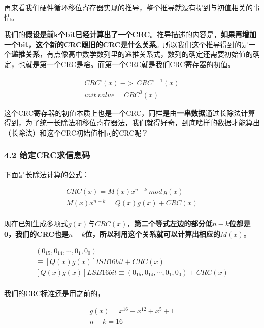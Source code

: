 \documentclass[
]{article}
\begin{document}
再来看我们硬件循环移位寄存器实现的推导，整个推导就没有提到与初值相关的事情。

我们的\textbf{假设是前k个bit已经计算出了一个CRC}。推导描述的内容是，\textbf{如果再增加一个bit，这个新的CRC跟旧的CRC是什么关系}。所以我们这个推导得到的是一个\textbf{递推关系}，有点像高中数学数列里的递推关系式，数列的确定还需要初始值的确定，也就是第一个CRC是啥。而第一个CRC就是我们CRC寄存器的初值。

\begin{equation}
\begin{aligned}
CRC^i(x) \: -> \: CRC^{i+1}(x)\\
init \: value =CRC^0(x)
\end{aligned}
\end{equation}

这个CRC寄存器的初值本质上也是一个CRC，同样是由\textbf{一串数据}通过长除法计算得到，为了统一长除法和移位寄存器法，我们就得好奇，到底啥样的数据才能算出（长除法）和这个CRC初始值相同的CRC呢？

\hypertarget{header-n200}{%
\subsubsection{4.2 给定CRC求信息码}\label{header-n200}}

下面是长除法计算的公式：

\begin{equation}
\begin{aligned}
CRC(x)=M(x)x^{n-k} \: mod \: g(x)\\
M(x)x^{n-k}=Q(x)g(x)+CRC(x)\\
\end{aligned}
\end{equation}

现在已知生成多项式$g(x)$与$CRC(x)$，\textbf{第二个等式左边的部分低$n-k$位都是0，我们的CRC也是$n-k$位，所以利用这个关系就可以计算出相应的$M(x)$}。

\begin{equation}
\begin{aligned}
(0_{15},0_{14},\cdots,0_1,0_0)\\
\equiv [Q(x)g(x)] lSB16bit +CRC(x)\\
 [Q(x)g(x)] LSB16bit \equiv (0_{15},0_{14},\cdots,0_1,0_0)+CRC(x)\\
\end{aligned}
\end{equation}

我们的CRC标准还是用之前的，

\begin{equation}
\begin{aligned}
g(x)=x^{16}+x^{12}+x^5+1\\
n-k=16
\end{aligned}
\end{equation}
\end{document}
